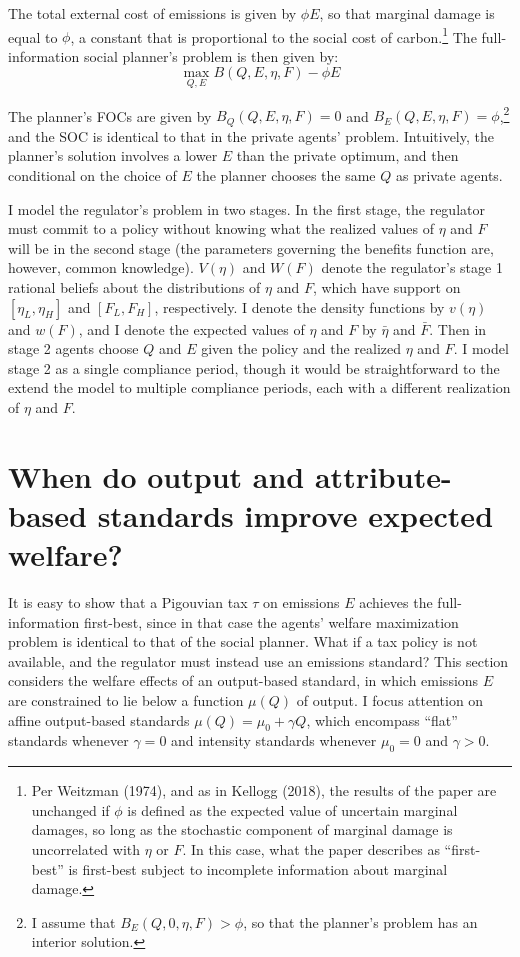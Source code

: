 \documentclass[12pt]{article}
\begin{document}
The total external cost of emissions is given by $\phi E$, so that marginal damage is equal to $\phi$, a constant that is proportional to the social cost of carbon.\footnote{Per Weitzman (1974), and as in Kellogg (2018), the results of the paper are unchanged if $\phi$ is defined as the expected value of uncertain marginal damages, so long as the stochastic component of marginal damage is uncorrelated with $\eta$ or $F$. In this case, what the paper describes as ``first-best'' is first-best subject to incomplete information about marginal damage.} The full-information social planner's problem is then given by:
\begin{equation}
\max_{Q,E}B(Q,E,\eta,F)-\phi E \label{eq:SP}
\end{equation}

The planner's FOCs are given by $B_Q(Q,E,\eta,F)=0$ and $B_E(Q,E,\eta,F)=\phi$,\footnote{I assume that $B_E(Q,0,\eta,F)>\phi$, so that the planner's problem has an interior solution.} and the SOC is identical to that in the private agents' problem. Intuitively, the planner's solution involves a lower $E$ than the private optimum, and then conditional on the choice of $E$ the planner chooses the same $Q$ as private agents.

I model the regulator's problem in two stages. In the first stage, the regulator must commit to a policy without knowing what the realized values of $\eta$ and $F$ will be in the second stage (the parameters governing the benefits function are, however, common knowledge). $V(\eta)$ and $W(F)$ denote the regulator's stage 1 rational beliefs about the distributions of $\eta$ and $F$, which have support on $[\eta_L,\eta_H]$ and $[F_L,F_H]$, respectively. I denote the density functions by $v(\eta)$ and $w(F)$, and I denote the expected values of $\eta$ and $F$ by $\bar{\eta}$ and $\bar{F}$. Then in stage 2 agents choose $Q$ and $E$ given the policy and the realized $\eta$ and $F$. I model stage 2 as a single compliance period, though it would be straightforward to the extend the model to multiple compliance periods, each with a different realization of $\eta$ and $F$.


\section{When do output and attribute-based standards improve expected welfare?} \label{sec:thy}

It is easy to show that a Pigouvian tax $\tau$ on emissions $E$ achieves the full-information first-best, since in that case the agents' welfare maximization problem is identical to that of the social planner. What if a tax policy is not available, and the regulator must instead use an emissions standard? This section considers the welfare effects of an output-based standard, in which emissions $E$ are constrained to lie below a function $\mu(Q)$ of output. I focus attention on affine output-based standards $\mu(Q)=\mu_0+\gamma Q$, which encompass ``flat'' standards whenever $\gamma=0$ and intensity standards whenever $\mu_0=0$ and $\gamma>0$.
\end{document}
